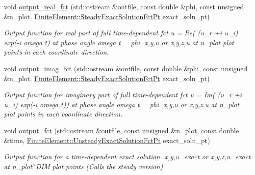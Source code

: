 \begin{DoxyCompactItemize}
void \hyperlink{classoomph_1_1QPMLHelmholtzElement_aeb5ace5d9ef5af956d7d41bce732df70}{output\+\_\+real\+\_\+fct} (std\+::ostream \&outfile, const double \&phi, const unsigned \&n\+\_\+plot, \hyperlink{classoomph_1_1FiniteElement_a690fd33af26cc3e84f39bba6d5a85202}{Finite\+Element\+::\+Steady\+Exact\+Solution\+Fct\+Pt} exact\+\_\+soln\+\_\+pt)
\begin{DoxyCompactList}\small\item\em Output function for real part of full time-\/dependent fct u = Re( (u\+\_\+r +i u\+\_\+i) exp(-\/i omega t) at phase angle omega t = phi. x,y,u or x,y,z,u at n\+\_\+plot plot points in each coordinate direction. \end{DoxyCompactList}\item 
void \hyperlink{classoomph_1_1QPMLHelmholtzElement_a320db04f4b93671c91041ff1728727cf}{output\+\_\+imag\+\_\+fct} (std\+::ostream \&outfile, const double \&phi, const unsigned \&n\+\_\+plot, \hyperlink{classoomph_1_1FiniteElement_a690fd33af26cc3e84f39bba6d5a85202}{Finite\+Element\+::\+Steady\+Exact\+Solution\+Fct\+Pt} exact\+\_\+soln\+\_\+pt)
\begin{DoxyCompactList}\small\item\em Output function for imaginary part of full time-\/dependent fct u = Im( (u\+\_\+r +i u\+\_\+i) exp(-\/i omega t)) at phase angle omega t = phi. x,y,u or x,y,z,u at n\+\_\+plot plot points in each coordinate direction. \end{DoxyCompactList}\item 
void \hyperlink{classoomph_1_1QPMLHelmholtzElement_a3df73a2a3a9ad64f555719ecee3f7f40}{output\+\_\+fct} (std\+::ostream \&outfile, const unsigned \&n\+\_\+plot, const double \&time, \hyperlink{classoomph_1_1FiniteElement_ad4ecf2b61b158a4b4d351a60d23c633e}{Finite\+Element\+::\+Unsteady\+Exact\+Solution\+Fct\+Pt} exact\+\_\+soln\+\_\+pt)
\begin{DoxyCompactList}\small\item\em Output function for a time-\/dependent exact solution. x,y,u\+\_\+exact or x,y,z,u\+\_\+exact at n\+\_\+plot$^\wedge$\+D\+IM plot points (Calls the steady version) \end{DoxyCompactList}\end{DoxyCompactItemize}
